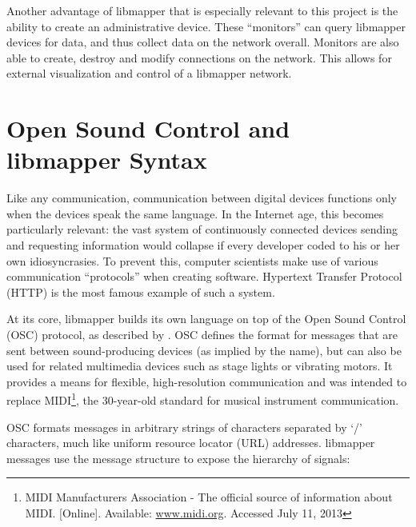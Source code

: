 Another advantage of libmapper that is especially relevant to this project is the ability to create an administrative device. These ``monitors'' can query libmapper devices for data, and thus collect data on the network overall. Monitors are also able to create, destroy and modify connections on the network. This allows for external visualization and control of a libmapper network.

	\section{Open Sound Control and libmapper Syntax} %
	\label{sec:open_sound_control_and_libmapper_syntax}


Like any communication, communication between digital devices functions only when the devices speak the same language. In the Internet age, this becomes particularly relevant: the vast system of continuously connected devices sending and requesting information would collapse if every developer coded to his or her own idiosyncrasies. To prevent this, computer scientists make use of various communication ``protocols'' when creating software. Hypertext Transfer Protocol (HTTP) is the most famous example of such a system.

At its core, libmapper builds its own language on top of the Open Sound Control (OSC) protocol, as described by . OSC defines the format for messages that are sent between sound-producing devices (as implied by the name), but can also be used for related multimedia devices such as stage lights or vibrating motors. It provides a means for flexible, high-resolution communication and was intended to replace MIDI\footnote{MIDI Manufacturers Association - The official source of information about MIDI. [Online]. Available: \url{www.midi.org}. Accessed July 11, 2013}, the 30-year-old standard for musical instrument communication. 

OSC formats messages in arbitrary strings of characters separated by `/' characters, much like uniform resource locator (URL) addresses. libmapper messages use the message structure to expose the hierarchy of signals:

